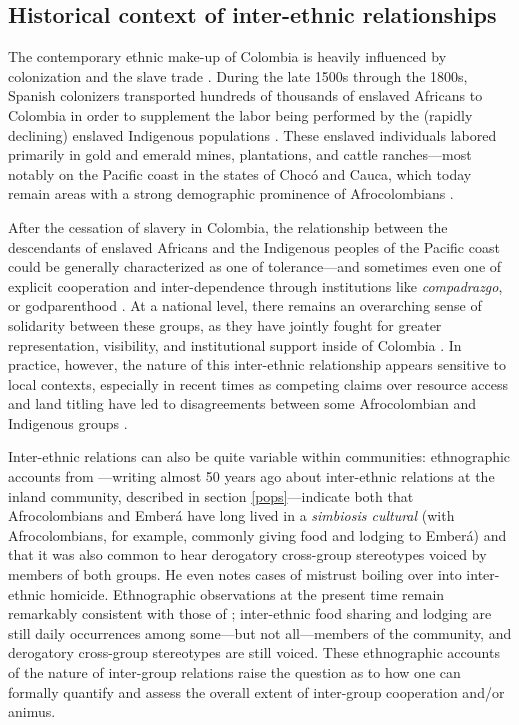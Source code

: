 \documentclass[bibauthoryear]{aa}
\begin{document}
\subsection{Historical context of inter-ethnic relationships}\label{histcon}
The contemporary ethnic make-up of Colombia is heavily influenced by colonization and the slave trade \citep{Can00, wade2002introduction, castillo2009discourse}.  During the late 1500s through the 1800s, Spanish colonizers transported hundreds of thousands of enslaved Africans to Colombia in order to supplement the labor being performed by the (rapidly declining)  enslaved Indigenous populations \citep{slavenote, gilbertomurillo2001el}. 
 These enslaved individuals labored primarily in gold and emerald mines, plantations, and cattle ranches---most notably on the Pacific coast in the states of Choc\'o and Cauca, which today remain areas with a strong demographic prominence of Afrocolombians \citep{gilbertomurillo2001el, wade2002introduction}. 

After the cessation of slavery in Colombia, the relationship between the descendants of enslaved Africans and the Indigenous peoples  of the Pacific coast could be generally characterized as one of tolerance---and sometimes even one of explicit cooperation and inter-dependence through institutions like \textit{compadrazgo}, or godparenthood \citep{Cay73}. At a national level, there remains an overarching sense of solidarity between these groups, as they have jointly fought for greater representation, visibility, and institutional support inside of Colombia \citep{castillo2009discourse, iglesiasvoces}. In practice, however, the nature of this inter-ethnic relationship appears sensitive to local contexts, especially in recent times as competing claims over resource access and land titling have led to disagreements between some Afrocolombian and Indigenous groups \citep{ng2000titling, davis2002indigenous, garcia2009diversos, velasco2011contested}. 
 
Inter-ethnic relations can also be quite variable within communities: ethnographic accounts from \citet{Cay73}---writing almost 50 years ago about inter-ethnic relations at the inland community, described in section \ref{pops}---indicate both that Afrocolombians and Ember\'a have long lived in a \textit{simbiosis cultural} (with Afrocolombians, for example, commonly giving food and lodging to Ember\'a) and that it was also common to hear derogatory cross-group stereotypes voiced by members of both groups. He even notes cases of mistrust boiling over into inter-ethnic homicide. Ethnographic observations at the present time remain remarkably consistent with those of \citet{Cay73}; inter-ethnic food sharing and lodging are still daily occurrences among some---but not all---members of the community, and derogatory cross-group stereotypes are still voiced. These ethnographic accounts of the nature of inter-group relations raise the question as to how one can formally quantify and assess the overall extent of inter-group cooperation and/or animus. 
\end{document}

